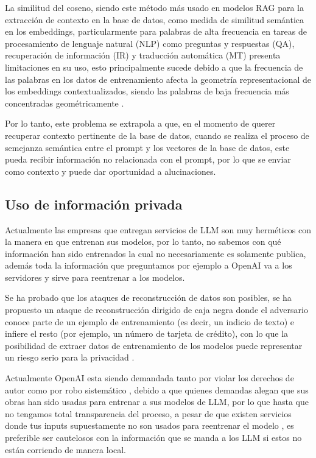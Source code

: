 La similitud del coseno, siendo este método más usado en modelos RAG para la extracción de contexto en la base de datos, 
como medida de similitud semántica en los embeddings, particularmente para palabras de alta frecuencia en tareas de 
procesamiento de lenguaje natural (NLP) como preguntas y respuestas (QA), recuperación de información (IR) y traducción 
automática (MT) presenta limitaciones en su uso, esto principalmente sucede debido a que la frecuencia de las palabras en los 
datos de entrenamiento afecta la geometría representacional de los embeddings contextualizados, siendo las palabras de baja 
frecuencia más concentradas geométricamente \cite{coseno}.

Por lo tanto, este problema se extrapola a que, en el momento de querer recuperar contexto pertinente de la base de datos, 
cuando se realiza el proceso de semejanza semántica entre el prompt y los vectores de la base de datos, este pueda recibir 
información no relacionada con el prompt, por lo que se enviar como contexto y puede dar oportunidad a alucinaciones.


\subsection{Uso de información privada}

Actualmente las empresas que entregan servicios de LLM son muy herméticos con la manera en que entrenan sus modelos, por lo tanto, no sabemos 
con qué información han sido entrenados la cual no necesariamente es solamente publica, además toda la información que preguntamos por ejemplo a 
OpenAI va a los servidores y sirve para reentrenar a los modelos.

Se ha probado que los ataques de reconstrucción de datos son posibles, se ha propuesto un ataque de reconstrucción dirigido de caja negra donde el 
adversario conoce parte de un ejemplo de entrenamiento (es decir, un indicio de texto) e infiere el resto (por ejemplo, un número de tarjeta de crédito), 
con lo que la posibilidad de extraer datos de entrenamiento de los modelos puede representar un riesgo serio para la privacidad \cite{privacidad1}. 

Actualmente OpenAI esta siendo demandada tanto por violar los derechos de autor \cite{privacidad3} como por robo sistemático \cite{privacidad2}, debido a que quienes 
demandas alegan que sus obras han sido usadas para entrenar a sus modelos de LLM, por lo que hasta que no tengamos total transparencia del proceso, 
a pesar de que existen servicios donde tus inputs supuestamente no son usados para reentrenar el modelo \cite{openai4}, es preferible ser cautelosos con la 
información que se manda a los LLM si estos no están corriendo de manera local.


